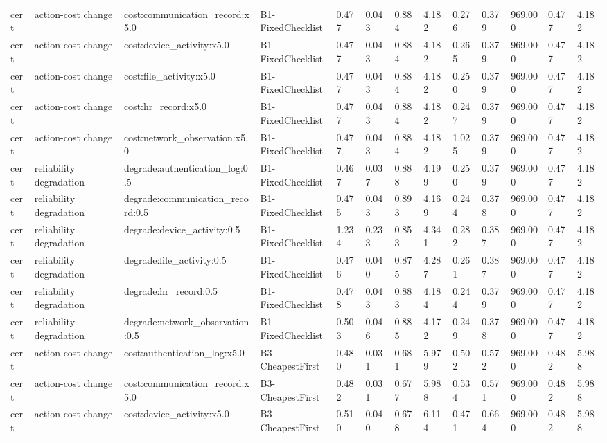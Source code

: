 \begin{table}[!ht]
{\begin{tabular}{lllllllllllll}
cert & action-cost change & cost:communication\_record:x5.0 & B1-FixedChecklist & 0.477 & 0.043 & 0.884 & 4.182 & 0.276 & 0.379 & 969.000 & 0.477 & 4.182 \\
cert & action-cost change & cost:device\_activity:x5.0 & B1-FixedChecklist & 0.477 & 0.043 & 0.884 & 4.182 & 0.265 & 0.379 & 969.000 & 0.477 & 4.182 \\
cert & action-cost change & cost:file\_activity:x5.0 & B1-FixedChecklist & 0.477 & 0.043 & 0.884 & 4.182 & 0.250 & 0.379 & 969.000 & 0.477 & 4.182 \\
cert & action-cost change & cost:hr\_record:x5.0 & B1-FixedChecklist & 0.477 & 0.043 & 0.884 & 4.182 & 0.247 & 0.379 & 969.000 & 0.477 & 4.182 \\
cert & action-cost change & cost:network\_observation:x5.0 & B1-FixedChecklist & 0.477 & 0.043 & 0.884 & 4.182 & 1.025 & 0.379 & 969.000 & 0.477 & 4.182 \\
cert & reliability degradation & degrade:authentication\_log:0.5 & B1-FixedChecklist & 0.467 & 0.037 & 0.888 & 4.199 & 0.250 & 0.379 & 969.000 & 0.477 & 4.182 \\
cert & reliability degradation & degrade:communication\_record:0.5 & B1-FixedChecklist & 0.475 & 0.043 & 0.893 & 4.169 & 0.244 & 0.378 & 969.000 & 0.477 & 4.182 \\
cert & reliability degradation & degrade:device\_activity:0.5 & B1-FixedChecklist & 1.234 & 0.233 & 0.853 & 4.341 & 0.282 & 0.387 & 969.000 & 0.477 & 4.182 \\
cert & reliability degradation & degrade:file\_activity:0.5 & B1-FixedChecklist & 0.476 & 0.040 & 0.875 & 4.287 & 0.261 & 0.387 & 969.000 & 0.477 & 4.182 \\
cert & reliability degradation & degrade:hr\_record:0.5 & B1-FixedChecklist & 0.478 & 0.043 & 0.883 & 4.184 & 0.244 & 0.379 & 969.000 & 0.477 & 4.182 \\
cert & reliability degradation & degrade:network\_observation:0.5 & B1-FixedChecklist & 0.503 & 0.046 & 0.885 & 4.172 & 0.249 & 0.378 & 969.000 & 0.477 & 4.182 \\
cert & action-cost change & cost:authentication\_log:x5.0 & B3-CheapestFirst & 0.480 & 0.031 & 0.681 & 5.979 & 0.502 & 0.572 & 969.000 & 0.482 & 5.988 \\
cert & action-cost change & cost:communication\_record:x5.0 & B3-CheapestFirst & 0.482 & 0.031 & 0.677 & 5.988 & 0.534 & 0.571 & 969.000 & 0.482 & 5.988 \\
cert & action-cost change & cost:device\_activity:x5.0 & B3-CheapestFirst & 0.510 & 0.040 & 0.678 & 6.114 & 0.471 & 0.664 & 969.000 & 0.482 & 5.988 \\

\end{tabular}}
\end{table}
